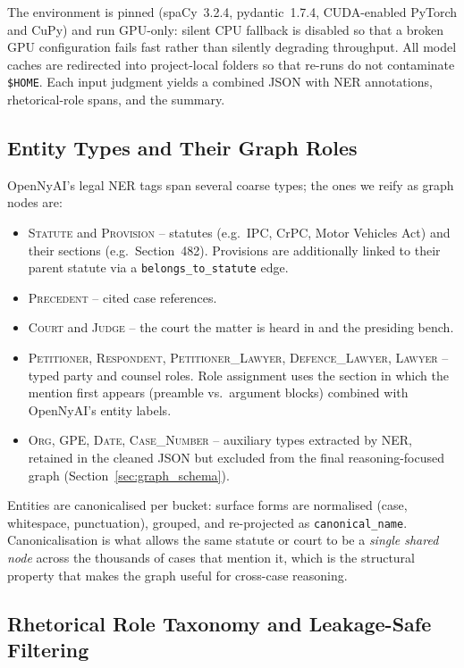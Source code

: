 The environment is pinned (spaCy~3.2.4, pydantic~1.7.4,
CUDA-enabled PyTorch and CuPy) and run GPU-only: silent CPU fallback is
disabled so that a broken GPU configuration fails fast rather than
silently degrading throughput. All model caches are redirected into
project-local folders so that re-runs do not contaminate
\texttt{\$HOME}. Each input judgment yields a combined JSON with NER
annotations, rhetorical-role spans, and the summary.

\subsection{Entity Types and Their Graph Roles}

OpenNyAI's legal NER tags span several coarse types; the ones we reify
as graph nodes are:

\begin{itemize}
  \item \textsc{Statute} and \textsc{Provision} -- statutes (e.g.\ IPC,
    CrPC, Motor Vehicles Act) and their sections (e.g.\ Section~482).
    Provisions are additionally linked to their parent statute via a
    \texttt{belongs\_to\_statute} edge.
  \item \textsc{Precedent} -- cited case references.
  \item \textsc{Court} and \textsc{Judge} -- the court the matter is
    heard in and the presiding bench.
  \item \textsc{Petitioner}, \textsc{Respondent},
    \textsc{Petitioner\_Lawyer}, \textsc{Defence\_Lawyer},
    \textsc{Lawyer} -- typed party and counsel roles. Role assignment
    uses the section in which the mention first appears (preamble vs.\
    argument blocks) combined with OpenNyAI's entity labels.
  \item \textsc{Org}, \textsc{GPE}, \textsc{Date}, \textsc{Case\_Number}
    -- auxiliary types extracted by NER, retained in the cleaned JSON
    but excluded from the final reasoning-focused graph
    (Section~\ref{sec:graph_schema}).
\end{itemize}

Entities are canonicalised per bucket: surface forms are normalised
(case, whitespace, punctuation), grouped, and re-projected as
\texttt{canonical\_name}. Canonicalisation is what allows the same
statute or court to be a \emph{single shared node} across the thousands
of cases that mention it, which is the structural property that makes
the graph useful for cross-case reasoning.

\subsection{Rhetorical Role Taxonomy and Leakage-Safe Filtering}

